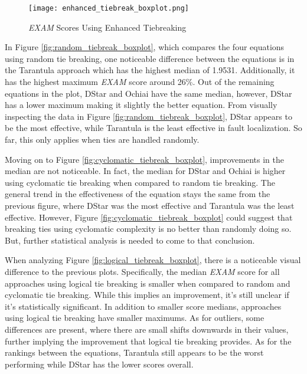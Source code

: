 \begin{figure}[!htb]
	\begin{center}
		\texttt{[image: enhanced\_tiebreak\_boxplot.png]}
		\caption{\label{fig:enhanced_tiebreak_boxplot} \emph{EXAM} Scores Using
		Enhanced Tiebreaking}
	\end{center}
\end{figure}

In Figure \ref{fig:random_tiebreak_boxplot}, which compares the four
equations using random tie breaking, one noticeable difference between the
equations is in the Tarantula approach which has the highest median of 1.9531.
Additionally, it has the highest maximum \emph{EXAM} score around 26\%.
Out of the remaining equations in the plot, DStar and Ochiai have the same
median, however, DStar has a lower maximum making it slightly the better
equation. From visually inspecting the data in Figure
\ref{fig:random_tiebreak_boxplot}, DStar appears to be the most effective, while
Tarantula is the least effective in fault localization. So far, this only
applies when ties are handled randomly.

Moving on to Figure \ref{fig:cyclomatic_tiebreak_boxplot}, improvements in the
median are not noticeable. In fact, the median for DStar and Ochiai is higher
using cyclomatic tie breaking when compared to random tie breaking. The general
trend in the effectiveness of the equation stays the same from the previous
figure, where DStar was the most effective and Tarantula was the least
effective. However, Figure \ref{fig:cyclomatic_tiebreak_boxplot} could suggest
that breaking ties using cyclomatic complexity is no better than randomly doing
so. But, further statistical analysis is needed to come to that conclusion.

When analyzing Figure \ref{fig:logical_tiebreak_boxplot}, there is a noticeable
visual difference to the previous plots. Specifically, the median
\emph{EXAM} score for all approaches using logical tie breaking is smaller when
compared to random and cyclomatic tie breaking. While this implies an
improvement, it's still unclear if it's statistically significant. In addition
to smaller score medians, approaches using logical tie breaking have smaller
maximums. As for outliers, some differences are present, where there are small
shifts downwards in their values, further implying the improvement that logical
tie breaking provides. As for the rankings between the equations, Tarantula
still appears to be the worst performing while DStar has the lower scores
overall.


